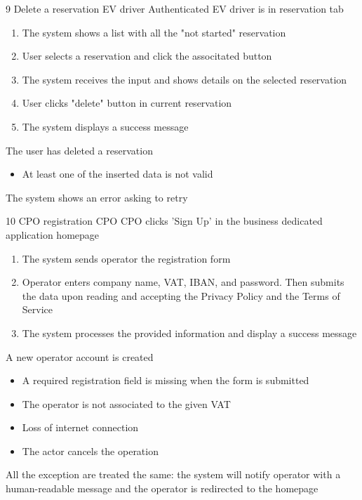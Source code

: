 \usecase
{9}
{Delete a reservation}
{EV driver}
{Authenticated EV driver is in reservation tab}
{
    \begin{enumerate}
        \item The system shows a list with all the "not started" reservation
        \item User selects a reservation and click the associtated button
        \item The system receives the input and shows details on the selected reservation
        \item User clicks "delete" button in current reservation
        \item The system displays a success message
    \end{enumerate}
}
{The user has deleted a reservation}
{
    \begin{itemize}
        \item At least one of the inserted data is not valid
    \end{itemize}
}
{
    The system shows an error asking to retry
}


\usecase
{10}
{CPO registration} %
{CPO} %
{CPO clicks 'Sign Up' in the business dedicated application homepage} %
{ %
    \begin{enumerate}
        \item The system sends operator the registration form
        \item Operator enters company name, VAT, IBAN, and password. Then submits the data upon reading and accepting the Privacy Policy and the Terms of Service
        \item The system processes the provided information and display a success message
    \end{enumerate}
}
{A new operator account is created} %
{ %
    \begin{itemize}
        \item A required registration field is missing when the form is submitted
        \item The operator is not associated to the given VAT
        \item Loss of internet connection
        \item The actor cancels the operation
    \end{itemize}
}
{ %
    All the exception are treated the same: the system will notify operator with a human-readable message and the operator is redirected to the homepage
}

